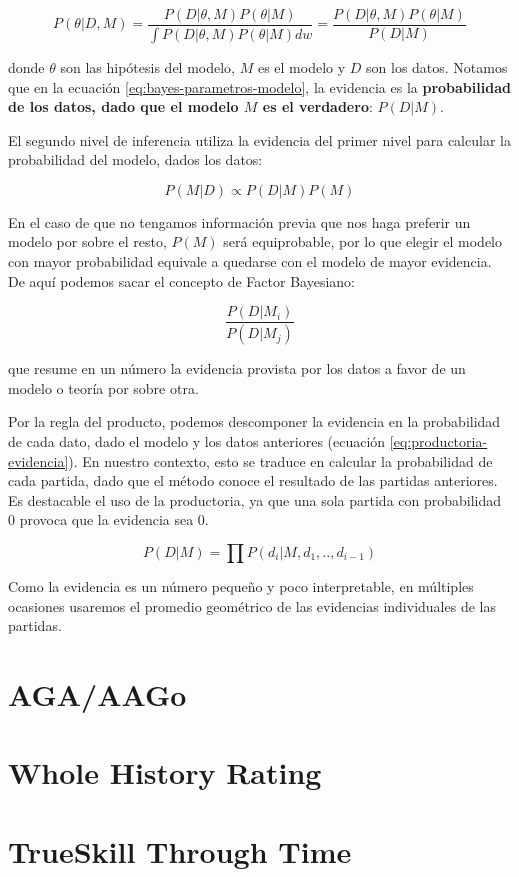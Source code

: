 \documentclass[a4paper,10pt]{report}
\begin{document}
\begin{equation}\label{eq:bayes-parametros-modelo}
	P(\theta | D, M) = \frac{P(D|\theta, M) P(\theta|M)}{\int P(D|\theta, M) P(\theta|M) dw} = \frac{P(D|\theta, M) P(\theta|M)}{P(D|M)}
\end{equation}

donde $\theta$ son las hip\'otesis del modelo, $M$ es el modelo y $D$ son los datos.
Notamos que en la ecuación \ref{eq:bayes-parametros-modelo}, la evidencia es la \textbf{probabilidad de los datos, dado que el modelo $M$ es el verdadero}: $P(D|M)$.

El segundo nivel de inferencia utiliza la evidencia del primer nivel para calcular la probabilidad del modelo, dados los datos:

\begin{equation}\label{eq:bayes-modelos}
	P(M | D) \propto P(D|M) P(M)
\end{equation}

En el caso de que no tengamos informaci\'on previa que nos haga preferir un modelo por sobre el resto, $P(M)$ ser\'a equiprobable, por lo que elegir el modelo con mayor probabilidad equivale a quedarse con el modelo de mayor evidencia.
De aqu\'i podemos sacar el concepto de Factor Bayesiano\cite{kass1995-bayesFactors}:

\begin{equation}
	\frac{P(D|M_i)}{P(D|M_j)}
\end{equation}

que resume en un n\'umero la evidencia provista por los datos a favor de un modelo o teor\'ia por sobre otra.

Por la regla del producto, podemos descomponer la evidencia en la probabilidad de cada dato, dado el modelo y los datos anteriores (ecuación \ref{eq:productoria-evidencia}).
En nuestro contexto, esto se traduce en calcular la probabilidad de cada partida, dado que el método conoce el resultado de las partidas anteriores.
Es destacable el uso de la productoria, ya que una sola partida con probabilidad 0 provoca que la evidencia sea 0.

\begin{equation}\label{eq:productoria-evidencia}
	P(D|M) = \prod P(d_i|M, d_{1}, .., d_{i-1})
\end{equation}

Como la evidencia es un número pequeño y poco interpretable, en múltiples ocasiones usaremos el promedio geométrico de las evidencias individuales de las partidas.

\section*{AGA/AAGo}

\section*{Whole History Rating}

\section*{TrueSkill Through Time}


\end{document}
